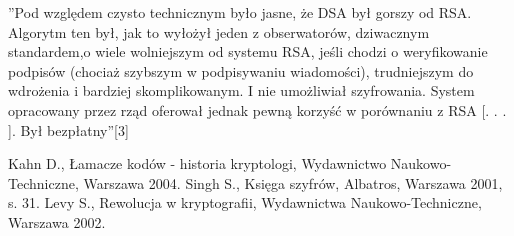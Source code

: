 \documentclass[a4paper]{article}
\begin{document}
\begin{center}
”Pod względem czysto technicznym było jasne, że DSA był gorszy od RSA. Algorytm ten był,
jak to wyłożył jeden z obserwatorów, dziwacznym standardem,o wiele wolniejszym od systemu
RSA, jeśli chodzi o weryfikowanie podpisów (chociaż szybszym w podpisywaniu wiadomości),
trudniejszym do wdrożenia i bardziej skomplikowanym. I nie umożliwiał szyfrowania. System
opracowany przez rząd oferował jednak pewną korzyść w porównaniu z RSA [. . . ]. Był
bezpłatny”[3]
\end{center}

\begin{thebibliography}{9}
Kahn D., Łamacze kodów - historia kryptologi, Wydawnictwo Naukowo-Techniczne, Warszawa
2004.
Singh S., Księga szyfrów, Albatros, Warszawa 2001, s. 31.
Levy S., Rewolucja w kryptografii, Wydawnictwa Naukowo-Techniczne, Warszawa 2002.
\end{thebibliography}
\end{document}
